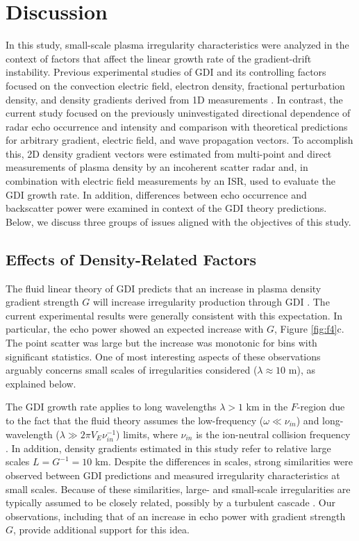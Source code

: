 \section{Discussion}
In this study, small-scale plasma irregularity characteristics were analyzed in the context of factors that affect the linear growth rate of the gradient-drift instability.  Previous experimental studies of GDI and its controlling factors focused on the convection electric field, electron density, fractional perturbation density, and density gradients derived from 1D measurements \citep[e.g.][]{Villian1986,Fukumoto1999,Fukumoto2000,Danskin2002,Oksavik2010,Moen2012,Makarevich2014b,Burston2016}.  In contrast, the current study focused on the previously uninvestigated directional dependence of radar echo occurrence and intensity and comparison with theoretical predictions for arbitrary gradient, electric field, and wave propagation vectors. To accomplish this, 2D density gradient vectors were estimated from multi-point and direct measurements of plasma density by an incoherent scatter radar and, in combination with electric field measurements by an ISR, used to evaluate the GDI growth rate.  In addition, differences between echo occurrence and backscatter power were examined in context of the GDI theory predictions. Below, we discuss three groups of issues aligned with the objectives of this study.



\subsection{Effects of Density-Related Factors}
\label{sec:discussion1}
The fluid linear theory of GDI predicts that an increase in plasma density gradient strength \(G\) will increase irregularity production through GDI \citep{Keskinen1983,Makarevich2014c}. The current experimental results were generally consistent with this expectation. In particular, the echo power showed an expected increase with \(G\), Figure \ref{fig:f4}c. The point scatter was large but the increase was monotonic for bins with significant statistics. One of  most interesting aspects of these observations arguably concerns small scales of irregularities considered (\(\lambda \approx 10\) m), as explained below.

The GDI growth rate applies to long wavelengths \(\lambda >1\) km in the $F$-region due to the fact that the fluid theory assumes the low-frequency (\(\omega \ll \nu_{in}\)) and long-wavelength (\(\lambda \gg 2\pi V_E\nu_{in}^{-1}\)) limits, where \(\nu_{in}\) is the ion-neutral collision frequency \citep[e.g.][]{Makarevich2014c}. In addition, density gradients estimated in this study refer to relative large scales \(L=G^{-1} =10\) km. Despite the differences in scales, strong similarities were observed between GDI predictions and measured irregularity characteristics at small scales. Because of these similarities, large- and small-scale irregularities are typically assumed to be closely related, possibly by a turbulent cascade \citep[e.g.][]{Tsunoda1988}. Our observations, including that of an increase in echo power with gradient strength \(G\), provide additional support for this idea.


